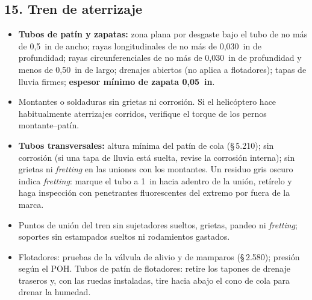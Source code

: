 \subsection*{15. Tren de aterrizaje}
\begin{itemize}
\item \textbf{Tubos de patín y zapatas:} zona plana por desgaste bajo el tubo de no más de 0,5~in de ancho; rayas longitudinales de no más de 0,030~in de profundidad; rayas circunferenciales de no más de 0,030~in de profundidad y menos de 0,50~in de largo; drenajes abiertos (no aplica a flotadores); tapas de lluvia firmes; \textbf{espesor mínimo de zapata 0,05~in}.
\item Montantes o soldaduras sin grietas ni corrosión. Si el helicóptero hace habitualmente aterrizajes corridos, verifique el torque de los pernos montante--patín.
\item \textbf{Tubos transversales:} altura mínima del patín de cola (\S\,5.210); sin corrosión (si una tapa de lluvia está suelta, revise la corrosión interna); sin grietas ni \emph{fretting} en las uniones con los montantes. Un residuo gris oscuro indica \emph{fretting}: marque el tubo a 1~in hacia adentro de la unión, retírelo y haga inspección con penetrantes fluorescentes del extremo por fuera de la marca.
\item Puntos de unión del tren sin sujetadores sueltos, grietas, pandeo ni \emph{fretting}; soportes sin estampados sueltos ni rodamientos gastados.
\item Flotadores: pruebas de la válvula de alivio y de mamparos (\S\,2.580); presión según el POH. Tubos de patín de flotadores: retire los tapones de drenaje traseros y, con las ruedas instaladas, tire hacia abajo el cono de cola para drenar la humedad.
\end{itemize}

